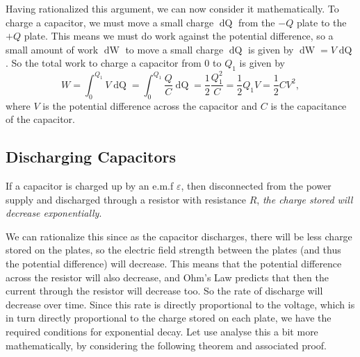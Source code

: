 Having rationalized this argument, we can now consider it mathematically. To charge a capacitor, we must move a small charge $\mathop{\mathrm{d}Q}$ from the $-Q$ plate  to the $+Q$ plate. This means we must do work against the potential difference, so a small amount of work $\mathop{\mathrm{d}W}$ to move a small charge $\mathop{\mathrm{d}Q}$ is given by $\mathop{\mathrm{d}W} = V \mathop{\mathrm{d}Q}$. So the total work to charge a capacitor from $0$ to $Q_1$ is given by 
\begin{equation}
    W = \int_0^{Q_1} V \mathop{\mathrm{d}Q} = \int_0^{Q_1} \frac{Q}{C} \mathop{\mathrm{d}Q} = \frac{1}{2} \frac{Q_1^2}{C} = \frac{1}{2} Q_1 V = \frac{1}{2} C V^2, 
\end{equation}
where $V$ is the potential difference across the capacitor and $C$ is the capacitance of the capacitor.

\subsection{Discharging Capacitors}
\label{subsection:discharging-capacitors}

If a capacitor is charged up by an e.m.f $\varepsilon$, then disconnected from the power supply and discharged through a resistor with resistance $R$, \textit{the charge stored will decrease exponentially}. 

We can rationalize this since as the capacitor discharges, there will be less charge stored on the plates, so the electric field strength between the plates (and thus the potential difference) will decrease. This means that the potential difference across the resistor will also decrease, and Ohm's Law predicts that then the current through the resistor will decrease too. So the rate of discharge will decrease over time. Since this rate is directly proportional to the voltage, which is in turn directly proportional to the charge stored on each plate, we have the required conditions for exponential decay. Let use analyse this a bit more mathematically, by considering the following theorem and associated proof.

